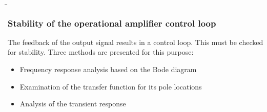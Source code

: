 \begin{frame}
{   %
   } 
	\b{\frametitle{Stability of the operational amplifier control loop}
    The feedback of the output signal results in a control loop. This must be checked for stability. Three methods are presented for this purpose:
    \begin{itemize}
    \item Frequency response analysis based on the Bode diagram
    \item Examination of the transfer function for its pole locations
    \item Analysis of the transient response
    \end{itemize}}
\end{frame}

